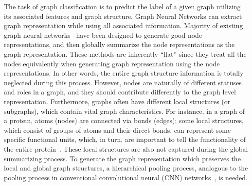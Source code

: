 \documentclass[sigconf]{acmart}
\begin{document}
The task of graph classification is to predict the label of a given graph utilizing its associated features and graph structure. Graph Neural Networks can extract graph representation while using all associated information. Majority of existing graph neural networks~\cite{dai2016discriminative,duvenaud2015convolutional,gilmer2017neural,li2015gated} have been designed to generate good node representations, and then globally summarize the node representations as the graph representation. These methods are inherently ``flat'' since they treat all the nodes equivalently when generating graph representation using the node representations. In other words, the entire graph structure information is totally neglected during this process. However, nodes are naturally of different statuses and roles in a graph, and they should contribute differently to the graph level representation. Furthermore, graphs often have different local structures (or subgraphs), which contain vital graph characteristics. For instance, in a graph of a protein, atoms (nodes) are connected via bonds (edges); some local structures, which consist of groups of atoms and their direct bonds, can represent some specific functional units, which, in turn, are important to tell the functionality of the entire protein~\cite{shervashidze2011weisfeiler,duvenaud2015convolutional,borgwardt2005protein}. These local structures are also not captured during the global summarizing process. To generate the graph representation which preserves the local and global graph structures, a hierarchical pooling process, analogous to the pooling process in conventional convolutional neural (CNN) networks~\cite{krizhevsky2012imagenet}, is needed.  
 
\end{document}
